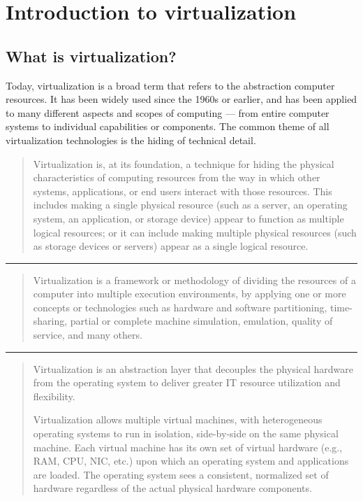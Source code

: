 \chapter{Introduction to virtualization}



\section{What is virtualization?}

Today, virtualization is a broad term that refers to the abstraction computer
resources. It has been widely used since the 1960s or earlier, and has been
applied to many different aspects and scopes of computing — from entire
computer systems to individual capabilities or components. The common theme of
all virtualization technologies is the hiding of technical detail.

\begin{quote}
Virtualization is, at its foundation, a technique for hiding the physical
characteristics of computing resources from the way in which other systems,
applications, or end users interact with those resources. This includes making
a single physical resource (such as a server, an operating system, an
application, or storage device) appear to function as multiple logical
resources; or it can include making multiple physical resources (such as
storage devices or servers) appear as a single logical resource.~\cite{ema101}
\end{quote}

\begin{center}
\rule{10.0em}{0.02em}
\end{center}

\begin{quote}
Virtualization is a framework or methodology of dividing the resources of a
computer into multiple execution environments, by applying one or more concepts
or technologies such as hardware and software partitioning, time-sharing,
partial or complete machine simulation, emulation, quality of service, and many
others.~\cite{singh-intro}
\end{quote}

\begin{center}
\rule{10.0em}{0.02em}
\end{center}

\begin{quote}
Virtualization is an abstraction layer that decouples the physical hardware
from the operating system to deliver greater IT resource utilization and
flexibility.

Virtualization allows multiple virtual machines, with heterogeneous operating
systems to run in isolation, side-by-side on the same physical machine. Each
virtual machine has its own set of virtual hardware (e.g., RAM, CPU, NIC, etc.)
upon which an operating system and applications are loaded. The operating
system sees a consistent, normalized set of hardware regardless of the actual
physical hardware components.~\cite{vmware-intro}
\end{quote}

